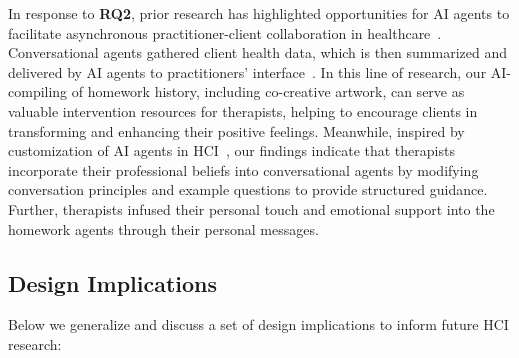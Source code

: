In response to \textbf{RQ2}, prior research has highlighted opportunities for AI agents to facilitate asynchronous practitioner-client collaboration in healthcare~\cite{yang2024talk2care}. Conversational agents gathered client health data, which is then summarized and delivered by AI agents to practitioners' interface~\cite{kim2024mindfuldiary}. 
In this line of research, our AI-compiling of homework history, including co-creative artwork, can serve as valuable intervention resources for therapists, helping to encourage clients in transforming and enhancing their positive feelings. 
Meanwhile, inspired by customization of AI agents in HCI~\cite{ha2024clochat,hedderich2024piece}, our findings indicate that therapists incorporate their professional beliefs into conversational agents by modifying conversation principles and example questions to provide structured guidance. Further, therapists infused their personal touch and emotional support into the homework agents through their personal messages.

\subsection{Design Implications}
Below we generalize and discuss a set of design implications to inform future HCI research:

